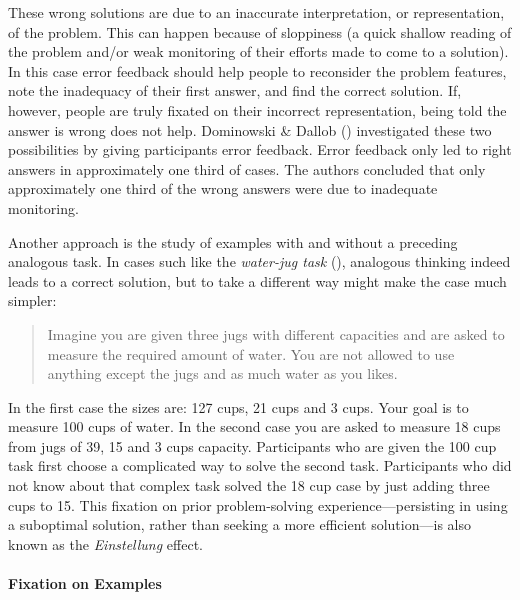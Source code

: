 \documentclass[
]{krantz}
\begin{document}
These wrong solutions are due to an inaccurate interpretation, or representation, of the problem. This can happen because of sloppiness (a quick shallow reading of the problem and/or weak monitoring of their efforts made to come to a solution). In this case error feedback should help people to reconsider the problem features, note the inadequacy of their first answer, and find the correct solution. If, however, people are truly fixated on their incorrect representation, being told the answer is wrong does not help. Dominowski \& Dallob () investigated these two possibilities by giving participants error feedback. Error feedback only led to right answers in approximately one third of cases. The authors concluded that only approximately one third of the wrong answers were due to inadequate monitoring.

Another approach is the study of examples with and without a preceding analogous task. In cases such like the \emph{water-jug task} (), analogous thinking indeed leads to a correct solution, but to take a different way might make the case much simpler:

\begin{quote}
Imagine you are given three jugs with different capacities and are asked to measure the required amount of water. You are not allowed to use anything except the jugs and as much water as you likes.
\end{quote}

In the first case the sizes are: 127 cups, 21 cups and 3 cups. Your goal is to measure 100 cups of water. In the second case you are asked to measure 18 cups from jugs of 39, 15 and 3 cups capacity. Participants who are given the 100 cup task first choose a complicated way to solve the second task. Participants who did not know about that complex task solved the 18 cup case by just adding three cups to 15. This fixation on prior problem-solving experience---persisting in using a suboptimal solution, rather than seeking a more efficient solution---is also known as the \emph{Einstellung} effect.

\paragraph*{Fixation on Examples}\label{fixation-on-examples}
\end{document}
